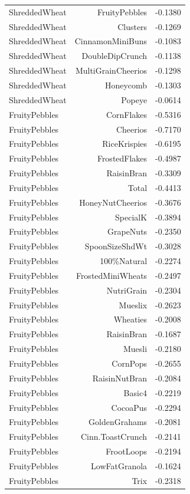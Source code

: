 \begin{longtable}{@{}lrr@{}}
ShreddedWheat & FruityPebbles & -0.1380 \\
ShreddedWheat & Clusters & -0.1269 \\
ShreddedWheat & CinnamonMiniBuns & -0.1083 \\
ShreddedWheat & DoubleDipCrunch & -0.1138 \\
ShreddedWheat & MultiGrainCheerios & -0.1298 \\
ShreddedWheat & Honeycomb & -0.1303 \\
ShreddedWheat & Popeye & -0.0614 \\
FruityPebbles & CornFlakes & -0.5316 \\
FruityPebbles & Cheerios & -0.7170 \\
FruityPebbles & RiceKrispies & -0.6195 \\
FruityPebbles & FrostedFlakes & -0.4987 \\
FruityPebbles & RaisinBran & -0.3309 \\
FruityPebbles & Total & -0.4413 \\
FruityPebbles & HoneyNutCheerios & -0.3676 \\
FruityPebbles & SpecialK & -0.3894 \\
FruityPebbles & GrapeNuts & -0.2350 \\
FruityPebbles & SpoonSizeShdWt & -0.3028 \\
FruityPebbles & 100\%Natural & -0.2274 \\
FruityPebbles & FrostedMiniWheats & -0.2497 \\
FruityPebbles & NutriGrain & -0.2304 \\
FruityPebbles & Mueslix & -0.2623 \\
FruityPebbles & Wheaties & -0.2008 \\
FruityPebbles & RaisinBran & -0.1687 \\
FruityPebbles & Muesli & -0.2180 \\
FruityPebbles & CornPops & -0.2655 \\
FruityPebbles & RaisinNutBran & -0.2084 \\
FruityPebbles & Basic4 & -0.2219 \\
FruityPebbles & CocoaPus & -0.2294 \\
FruityPebbles & GoldenGrahams & -0.2081 \\
FruityPebbles & Cinn.ToastCrunch & -0.2141 \\
FruityPebbles & FrootLoops & -0.2194 \\
FruityPebbles & LowFatGranola & -0.1624 \\
FruityPebbles & Trix & -0.2318 \\

\end{longtable}
